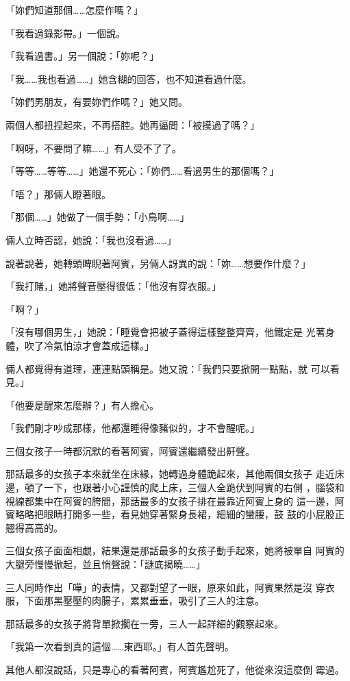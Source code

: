 「妳們知道那個……怎麼作嗎？」

「我看過錄影帶。」一個說。

「我看過書。」另一個說：「妳呢？」

「我……我也看過……」她含糊的回答，也不知道看過什麼。

「妳們男朋友，有要妳們作嗎？」她又問。

兩個人都扭捏起來，不再搭腔。她再逼問：「被摸過了嗎？」

「啊呀，不要問了嘛……」有人受不了了。

「等等……等等……」她還不死心：「妳們……看過男生的那個嗎？」

「唔？」那倆人瞪著眼。

「那個……」她做了一個手勢：「小鳥啊……」

倆人立時否認，她說：「我也沒看過……」

說著說著，她轉頭睥睨著阿賓，另倆人訝異的說：「妳……想要作什麼？」

「我打賭，」她將聲音壓得很低：「他沒有穿衣服。」

「啊？」

「沒有哪個男生，」她說：「睡覺會把被子蓋得這樣整整齊齊，他鐵定是
光著身體，吹了冷氣怕涼才會蓋成這樣。」

倆人都覺得有道理，連連點頭稱是。她又說：「我們只要掀開一點點，就
可以看見。」

「他要是醒來怎麼辦？」有人擔心。

「我們剛才吵成那樣，他都還睡得像豬似的，才不會醒呢。」

三個女孩子一時都沉默的看著阿賓，阿賓還繼續發出鼾聲。

那話最多的女孩子本來就坐在床緣，她轉過身體跪起來，其他兩個女孩子
走近床邊，頓了一下，也跟著小心謹慎的爬上床，三個人全跪伏到阿賓的右側
，腦袋和視線都集中在阿賓的胯間，那話最多的女孩子排在最靠近阿賓上身的
這一邊，阿賓略略把眼睛打開多一些，看見她穿著緊身長裙，細細的蠻腰，鼓
鼓的小屁股正翹得高高的。

三個女孩子面面相覷，結果還是那話最多的女孩子動手起來，她將被單自
阿賓的大腿旁慢慢掀起，並且悄聲說：「謎底揭曉……」

三人同時作出「嘩」的表情，又都對望了一眼，原來如此，阿賓果然是沒
穿衣服，下面那黑壓壓的肉腸子，累累垂垂，吸引了三人的注意。

那話最多的女孩子將背單掀擱在一旁，三人一起詳細的觀察起來。

「我第一次看到真的這個……東西耶。」有人首先聲明。

其他人都沒說話，只是專心的看著阿賓，阿賓尷尬死了，他從來沒這麼倒
霉過。

